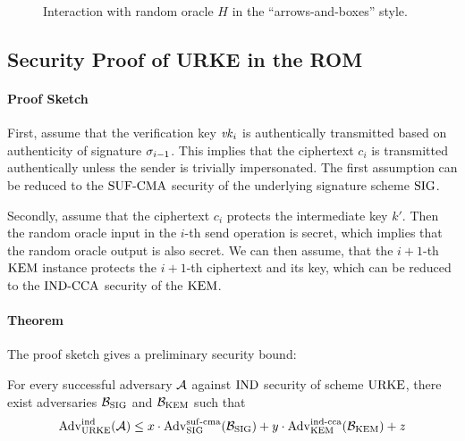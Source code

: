 \begin{figure}[!ht]
    \begin{minipage}[]{.5\textwidth}
        \centering
        \nicoresetlinenr%
        \fbox{%
            \scalebox{\codescalefactor}{%
            }%
        }
        \caption{%
            Simulation of a random oracle $H$.
        }
        \label{fig:rom:sim}
    \end{minipage}\hfill
    \begin{minipage}[]{.5\textwidth}
        \centering
        
        \caption{%
            Interaction with random oracle $H$ in the ``arrows-and-boxes'' style.
        }
        \label{fig:rom:overview}
    \end{minipage}
\end{figure}

\subsection{Security Proof of URKE in the ROM}

\paragraph{Proof Sketch} 
First, assume that the verification key $\mathit{vk}_i$ is authentically transmitted based on authenticity of signature $\sigma_{i-1}$.
This implies that the ciphertext $c_i$ is transmitted authentically unless the sender is trivially impersonated.
The first assumption can be reduced to the ${\mathrm{SUF}\text{-}\mathrm{CMA}}$ security of the underlying signature scheme $\mathrm{SIG}$.

Secondly, assume that the ciphertext $c_i$ protects the intermediate key $k'$.
Then the random oracle input in the $i$-th send operation is secret, which implies that the random oracle output is also secret.
We can then assume, that the $i+1$-th $\mathrm{KEM}$ instance protects the $i+1$-th ciphertext and its key, which can be reduced to the ${\mathrm{IND}\text{-}\mathrm{CCA}}$ security of the $\mathrm{KEM}$.

\paragraph{Theorem}
The proof sketch gives a preliminary security bound:

For every successful adversary $\mathcal{A}$ against ${\mathrm{IND}}$ security of scheme $\mathrm{URKE}$, there exist adversaries $\mathcal{B}_{\mathrm{SIG}}$ and $\mathcal{B}_{\mathrm{KEM}}$ such that
\[\mathrm{Adv}_{\mathrm{URKE}}^{\mathrm{ind}} (\mathcal{A})\leq x\cdot \mathrm{Adv}_{\mathrm{SIG}}^{\mathrm{suf}\text{-}\mathrm{cma}}(\mathcal{B}_{\mathrm{SIG}}) + y\cdot \mathrm{Adv}_{\mathrm{KEM}}^{\mathrm{ind}\text{-}\mathrm{cca}}(\mathcal{B}_{\mathrm{KEM}})+z\]

